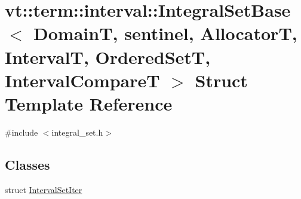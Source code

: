 \hypertarget{structvt_1_1term_1_1interval_1_1_integral_set_base}{}\section{vt\+:\+:term\+:\+:interval\+:\+:Integral\+Set\+Base$<$ DomainT, sentinel, AllocatorT, IntervalT, Ordered\+SetT, Interval\+CompareT $>$ Struct Template Reference}
\label{structvt_1_1term_1_1interval_1_1_integral_set_base}


{\ttfamily \#include $<$integral\+\_\+set.\+h$>$}

\subsection*{Classes}
\begin{DoxyCompactItemize}
\item 
struct \hyperlink{structvt_1_1term_1_1interval_1_1_integral_set_base_1_1_interval_set_iter}{Interval\+Set\+Iter}
\end{DoxyCompactItemize}

